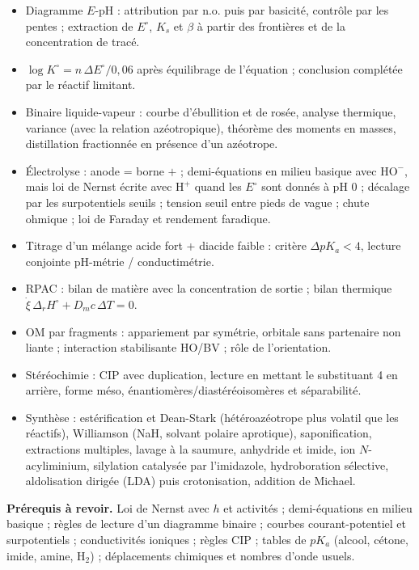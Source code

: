 \documentclass[11pt,a4paper]{article}
\providecommand{\tightlist}{\setlength{\itemsep}{0pt}\setlength{\parskip}{0pt}}
\begin{document}
\begin{itemize}
\tightlist
\item
  Diagramme \(E\)-pH : attribution par n.o. puis par basicité, contrôle par les pentes ; extraction de \(E^\circ\), \(K_s\) et \(\beta\) à partir des frontières et de la concentration de tracé.
\item
  \(\log K^\circ=n\,\Delta E^\circ/0{,}06\) après équilibrage de l'équation ; conclusion complétée par le réactif limitant.
\item
  Binaire liquide-vapeur : courbe d'ébullition et de rosée, analyse thermique, variance (avec la relation azéotropique), théorème des moments en masses, distillation fractionnée en présence d'un azéotrope.
\item
  Électrolyse : anode = borne \(+\) ; demi-équations en milieu basique avec \(\mathrm{HO^-}\), mais loi de Nernst écrite avec \(\mathrm{H^+}\) quand les \(E^\circ\) sont donnés à pH 0 ; décalage par les surpotentiels seuils ; tension seuil entre pieds de vague ; chute ohmique ; loi de Faraday et rendement faradique.
\item
  Titrage d'un mélange acide fort + diacide faible : critère \(\Delta pK_a<4\), lecture conjointe pH-métrie / conductimétrie.
\item
  RPAC : bilan de matière avec la concentration de sortie ; bilan thermique \(\dot\xi\,\Delta_rH^\circ+D_mc\,\Delta T=0\).
\item
  OM par fragments : appariement par symétrie, orbitale sans partenaire non liante ; interaction stabilisante HO/BV ; rôle de l'orientation.
\item
  Stéréochimie : CIP avec duplication, lecture en mettant le substituant 4 en arrière, forme méso, énantiomères/diastéréoisomères et séparabilité.
\item
  Synthèse : estérification et Dean-Stark (hétéroazéotrope plus volatil que les réactifs), Williamson (NaH, solvant polaire aprotique), saponification, extractions multiples, lavage à la saumure, anhydride et imide, ion \(N\)-acyliminium, silylation catalysée par l'imidazole, hydroboration sélective, aldolisation dirigée (LDA) puis crotonisation, addition de Michael.
\end{itemize}

\textbf{Prérequis à revoir.} Loi de Nernst avec \(h\) et activités ; demi-équations en milieu basique ; règles de lecture d'un diagramme binaire ; courbes courant-potentiel et surpotentiels ; conductivités ioniques ; règles CIP ; tables de \(pK_a\) (alcool, cétone, imide, amine, \(\mathrm{H_2}\)) ; déplacements chimiques et nombres d'onde usuels.
\end{document}
